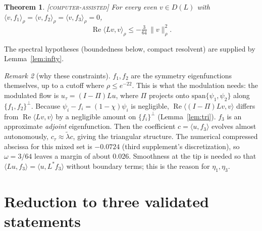 \documentclass[11pt]{amsart}
\newtheorem{theorem}{Theorem}
\theoremstyle{definition}
\theoremstyle{remark}
\newtheorem{remark}[theorem]{Remark}
\newcommand{\ip}[2]{\langle #1,#2\rangle}
\newcommand{\re}{\operatorname{Re}}
\newcommand{\lab}[1]{\textup{\textsc{[#1]}}}
\begin{document}
\begin{theorem}\label{thm:main}\lab{computer-assisted}
For every even $v\in D(L)$ with $\ip{v}{f_1}_\rho=\ip{v}{f_2}_\rho=\ip{v}{f_3}_\rho=0$,
\[
\re\ip{Lv}{v}_\rho\le-\tfrac{3}{64}\,\|v\|_\rho^2 .
\]
\end{theorem}
The spectral hypotheses (boundedness below, compact resolvent) are supplied by Lemma~\ref{lem:infty}.

\begin{remark}[why these constraints]
$f_1,f_2$ are the symmetry eigenfunctions themselves, up to a cutoff where $\rho\le e^{-22}$. This is what the modulation needs: the modulated flow is $u_\tau=(I-\Pi)Lu$, where $\Pi$ projects onto $\mathrm{span}\{\psi_1,\psi_2\}$ along $\{f_1,f_2\}^\perp$. Because $\psi_i-f_i=(1-\chi)\psi_i$ is negligible, $\re\ip{(I-\Pi)Lv}{v}$ differs from $\re\ip{Lv}{v}$ by a negligible amount on $\{f_i\}^\perp$ (Lemma~\ref{lem:tri}). $f_3$ is an approximate \emph{adjoint} eigenfunction. Then the coefficient $c=\ip{u}{f_3}$ evolves almost autonomously, $c_\tau\approx\tilde\lambda c$, giving the triangular structure. The numerical compressed abscissa for this mixed set is $-0.0724$ (third supplement's discretization), so $\omega=3/64$ leaves a margin of about $0.026$. Smoothness at the tip is needed so that $\ip{Lu}{f_3}=\ip{u}{L^*f_3}$ without boundary terms; this is the reason for $\eta_1,\eta_3$.
\end{remark}

\section{Reduction to three validated statements}
\end{document}
